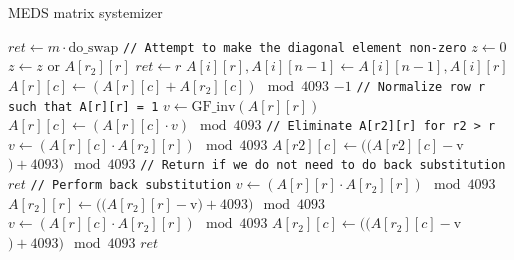 \begin{algorithm}
  \caption{MEDS matrix systemizer}
  \label{alg:systemizer}
  \begin{algorithmic}
      \State $ret \gets m \cdot \text{do\_swap}$
        \State \texttt{// Attempt to make the diagonal element non-zero}
          \State $z \gets 0$
            \State $z \gets z$ or $A[r_2][r]$
          \EndFor
            \State $ret \gets r$
              \State $A[i][r], A[i][n-1] \gets A[i][n-1], A[i][r]$
            \EndFor
          \EndIf
        \EndIf
              \State $A[r][c] \gets (A[r][c] + A[r_2][c]) \mod 4093$
            \EndFor
          \EndIf
        \EndFor
          \State \Return $-1$
        \EndIf
        \State \texttt{// Normalize row r such that A[r][r] = 1}
        \State $v \gets \text{GF\_inv}(A[r][r])$
          \State $A[r][c] \gets (A[r][c] \cdot v) \mod 4093$
        \EndFor
        \State \texttt{// Eliminate A[r2][r] for r2 > r}
            \State $v \gets (A[r][c] \cdot A[r_2][r]) \mod 4093$
            \State $A[r2][c] \gets ((A[r2][c] - $v$) + 4093) \mod 4093$
          \EndFor
        \EndFor
      \EndFor
      \State \texttt{// Return if we do not need to do back substitution}
        \State \Return $ret$
      \EndIf
      \State \texttt{// Perform back substitution}
          \State $v \gets (A[r][r] \cdot A[r_2][r]) \mod 4093$
          \State $A[r_2][r] \gets ((A[r_2][r] - $v$) + 4093) \mod 4093$
            \State $v \gets (A[r][c] \cdot A[r_2][r]) \mod 4093$
            \State $A[r_2][c] \gets ((A[r_2][c] - $v$) + 4093) \mod 4093$
          \EndFor
        \EndFor
      \EndFor
      \State \Return $ret$
    \EndFunction
  \end{algorithmic}
\end{algorithm}